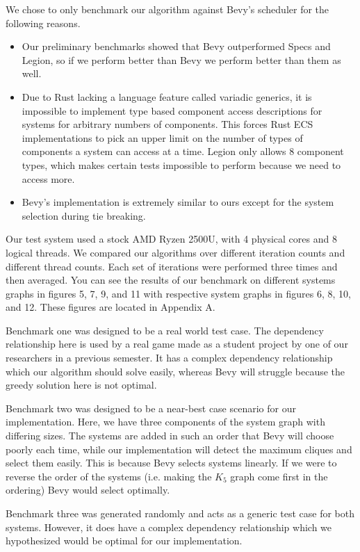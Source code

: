 \documentclass[conference]{IEEEtran}
\begin{document}
We chose to only benchmark our algorithm against Bevy's scheduler for the following reasons.

\begin{itemize}
\item Our preliminary benchmarks showed that Bevy outperformed Specs and Legion, so if we perform better than Bevy we perform better than them as well.
\item Due to Rust lacking a language feature called variadic generics, it is impossible to implement type based component access descriptions for systems for arbitrary numbers of components. This forces Rust ECS implementations to pick an upper limit on the number of types of components a system can access at a time. Legion only allows 8 component types, which makes certain tests impossible to perform because we need to access more.
\item Bevy's implementation is extremely similar to ours except for the system selection during tie breaking.
\end{itemize}

Our test system used a stock AMD Ryzen 2500U, with 4 physical cores and 8 logical threads. We compared our algorithms over different iteration counts and different thread counts. Each set of iterations were performed three times and then averaged. You can see the results of our benchmark on different systems graphs in figures 5, 7, 9, and 11 with respective system graphs in figures 6, 8, 10, and 12. These figures are located in Appendix A.

Benchmark one was designed to be a real world test case. The dependency relationship here is used by a real game made as a student project by one of our researchers in a previous semester. It has a complex dependency relationship which our algorithm should solve easily, whereas Bevy will struggle because the greedy solution here is not optimal.

Benchmark two was designed to be a near-best case scenario for our implementation. Here, we have three components of the system graph with differing sizes. The systems are added in such an order that Bevy will choose poorly each time, while our implementation will detect the maximum cliques and select them easily. This is because Bevy selects systems linearly. If we were to reverse the order of the systems (i.e. making the $K_5$ graph come first in the ordering) Bevy would select optimally.

Benchmark three was generated randomly and acts as a generic test case for both systems. However, it does have a complex dependency relationship which we hypothesized would be optimal for our implementation.
\end{document}
